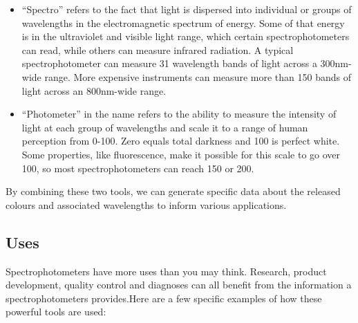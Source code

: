 \documentclass[12pt]{article}
\begin{document}
\begin{itemize}
  \item “Spectro” refers to the fact that light is dispersed into individual or groups of wavelengths in the electromagnetic spectrum of energy. Some of that energy is in the ultraviolet and visible light range, which certain spectrophotometers can read, while others can measure infrared radiation. A typical spectrophotometer can measure 31 wavelength bands of light across a 300nm-wide range. More expensive instruments can measure more than 150 bands of light across an 800nm-wide range.
  \item “Photometer” in the name refers to the ability to measure the intensity of light at each group of wavelengths and scale it to a range of human perception from 0-100. Zero equals total darkness and 100 is perfect white. Some properties, like fluorescence, make it possible for this scale to go over 100, so most spectrophotometers can reach 150 or 200.
\end{itemize}
By combining these two tools, we can generate specific data about the released colours and associated wavelengths to inform various applications.


\subsection{Uses}

Spectrophotometers have more uses than you may think. Research, product development, quality control and diagnoses can all benefit from the information a spectrophotometers provides.Here are a few specific examples of how these powerful tools are used:
\end{document}
